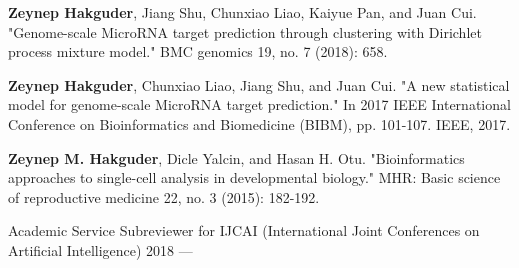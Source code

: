 \documentclass{resume} %
\begin{document}
{\bf Zeynep Hakguder}, Jiang Shu, Chunxiao Liao, Kaiyue Pan, and Juan Cui. "Genome-scale MicroRNA target prediction through clustering with Dirichlet process mixture model." BMC genomics 19, no. 7 (2018): 658.
\vspace*{0.05cm}

{\bf Zeynep Hakguder}, Chunxiao Liao, Jiang Shu, and Juan Cui. "A new statistical model for genome-scale MicroRNA target prediction." In 2017 IEEE International Conference on Bioinformatics and Biomedicine (BIBM), pp. 101-107. IEEE, 2017.
\vspace*{0.05cm}

{\bf Zeynep M. Hakguder}, Dicle Yalcin, and Hasan H. Otu. "Bioinformatics approaches to single-cell analysis in developmental biology." MHR: Basic science of reproductive medicine 22, no. 3 (2015): 182-192.

\begin{rSection}{Academic Service}
 Subreviewer for IJCAI (International Joint Conferences on Artificial Intelligence) \hfill{2018 ---}
\end{rSection}
\begin{comment}
\begin{rSection}{References}
{\bf Stephen Scott,} {\em Advisor \& Instructor of Design and Analysis of Algorithms}
\\
{\bf Vinod Variyam,} {\em Advisor \& Instructor of Design and Analysis of Algorithms}
\\
{\bf Juan Cui,} {\em PI of SBBI \& Instructor of Introduction to Programming, Data Structures and Algorithms}
\\
{\bf Mohammad Hassan,} {\em Instructor of Introduction to Machine Learning}
\end{rSection}
\end{comment}
\end{document}
